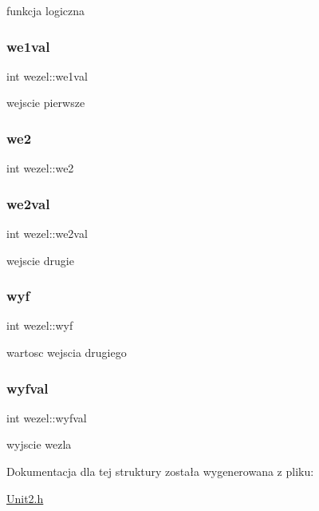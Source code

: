 funkcja logiczna 

\mbox{\label{structwezel_a7482d46998d0b6b95349e0a40c986910}} 
\subsubsection{\texorpdfstring{we1val}{we1val}}
{\footnotesize\ttfamily int wezel\+::we1val}



wejscie pierwsze 

\mbox{\label{structwezel_a39e4484f5cbc1b01af8ba76af636dec5}} 
\subsubsection{\texorpdfstring{we2}{we2}}
{\footnotesize\ttfamily int wezel\+::we2}

\mbox{\label{structwezel_a6b8efbe6f900d1bcd8bdc83a0ca304fd}} 
\subsubsection{\texorpdfstring{we2val}{we2val}}
{\footnotesize\ttfamily int wezel\+::we2val}



wejscie drugie 

\mbox{\label{structwezel_a23422c8c9e922d11f894414788b881aa}} 
\subsubsection{\texorpdfstring{wyf}{wyf}}
{\footnotesize\ttfamily int wezel\+::wyf}



wartosc wejscia drugiego 

\mbox{\label{structwezel_a194a323b0da80cd204f98ccc5946167b}} 
\subsubsection{\texorpdfstring{wyfval}{wyfval}}
{\footnotesize\ttfamily int wezel\+::wyfval}



wyjscie wezla 



Dokumentacja dla tej struktury została wygenerowana z pliku\+:\begin{DoxyCompactItemize}
\item 
\mbox{\hyperlink{_unit2_8h}{Unit2.\+h}}\end{DoxyCompactItemize}
